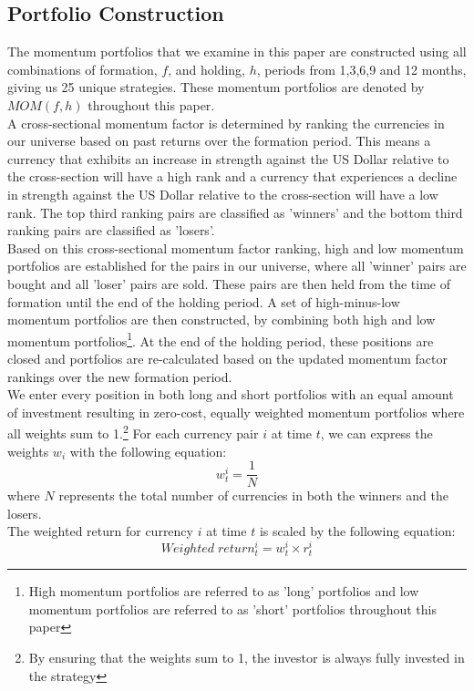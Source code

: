 \documentclass{article}
\begin{document}
\subsection{Portfolio Construction}

The momentum portfolios that we examine in this paper are constructed using all combinations of formation, $f$, and holding, $h$, periods from 1,3,6,9 and 12 months, giving us 25 unique strategies. These momentum portfolios are denoted by $MOM(f,h)$ throughout this paper. 
\\

A cross-sectional momentum factor is determined by ranking the currencies in our universe based on past returns over the formation period. This means a currency that exhibits an increase in strength against the US Dollar relative to the cross-section will have a high rank and a currency that experiences a decline in strength against the US Dollar relative to the cross-section will have a low rank. The top third ranking pairs are classified as 'winners' and the bottom third ranking pairs are classified as 'losers'. 
\\

Based on this cross-sectional momentum factor ranking, high and low momentum portfolios are established for the pairs in our universe, where all 'winner' pairs are bought and all 'loser' pairs are sold. These pairs are then held from the time of formation until the end of the holding period. A set of high-minus-low momentum portfolios are then constructed, by combining both high and low momentum portfolios\footnote{High momentum portfolios are referred to as 'long' portfolios and low momentum portfolios are referred to as 'short' portfolios throughout this paper}.
At the end of the holding period, these positions are closed and portfolios are re-calculated based on the updated momentum factor rankings over the new formation period.
\\

We enter every position in both long and short portfolios with an equal amount of investment resulting in zero-cost, equally weighted momentum portfolios where all weights sum to 1.\footnote{By ensuring that the weights sum to 1, the investor is always fully invested in the strategy} For each currency pair $i$ at time $t$, we can express the weights $w_i$ with the following equation:
$$w^i_t = \frac{1}{N}$$
where $N$ represents the total number of currencies in both the winners and the losers.
\\
The weighted return for currency $i$ at time $t$ is scaled by the following equation:
$$Weighted\;return^i_t = w^i_t \times r^i_t$$
\end{document}
